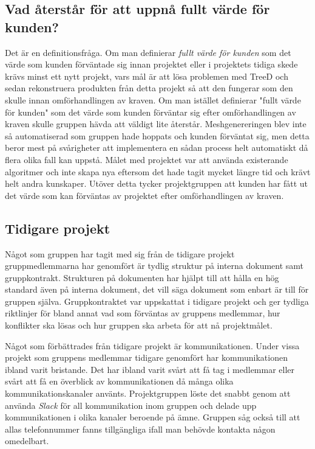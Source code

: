 \subsection{Vad återstår för att uppnå fullt värde för kunden?}
Det är en definitionsfråga. Om man definierar \textit{fullt värde för kunden} som det värde som kunden förväntade sig innan projektet eller i projektets tidiga skede krävs minst ett nytt projekt, vars mål är att lösa problemen med TreeD och sedan rekonstruera produkten från detta projekt så att den fungerar som den skulle innan omförhandlingen av kraven. Om man istället definierar "fullt värde för kunden" som det värde som kunden förväntar sig efter omförhandlingen av kraven skulle gruppen hävda att väldigt lite återstår. Meshgenereringen blev inte så automatiserad som gruppen hade hoppats och kunden förväntat sig, men detta beror mest på svårigheter att implementera en sådan process helt automatiskt då flera olika fall kan uppstå. Målet med projektet var att använda existerande algoritmer och inte skapa nya eftersom det hade tagit mycket längre tid och krävt helt andra kunskaper. Utöver detta tycker projektgruppen att kunden har fått ut det värde som kan förväntas av projektet efter omförhandlingen av kraven.


\subsection{Tidigare projekt}
Något som gruppen har tagit med sig från de tidigare projekt gruppmedlemmarna har genomfört är tydlig struktur på interna dokument samt gruppkontrakt. Strukturen på dokumenten har hjälpt till att hålla en hög standard även på interna dokument, det vill säga dokument som enbart är till för gruppen själva. Gruppkontraktet var uppskattat i tidigare projekt och ger tydliga riktlinjer för bland annat vad som förväntas av gruppens medlemmar, hur konflikter ska lösas och hur gruppen ska arbeta för att nå projektmålet.

Något som förbättrades från tidigare projekt är kommunikationen. Under vissa projekt som gruppens medlemmar tidigare genomfört har kommunikationen ibland varit bristande. Det har ibland varit svårt att få tag i medlemmar eller svårt att få en överblick av kommunikationen då många olika kommunikationskanaler använts. Projektgruppen löste det snabbt genom att använda \textit{Slack} för all kommunikation inom gruppen och delade upp kommunikationen i olika kanaler beroende på ämne. Gruppen såg också till att allas telefonnummer fanns tillgängliga ifall man behövde kontakta någon omedelbart.


